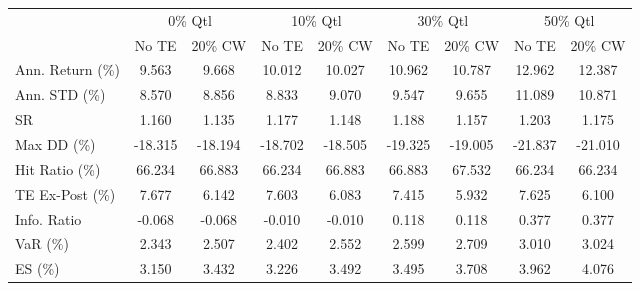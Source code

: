 \begin{tabular}{lcccccccc}
\toprule
{} & \multicolumn{2}{c}{0\% Qtl} & \multicolumn{2}{c}{10\% Qtl} & \multicolumn{2}{c}{30\% Qtl} & \multicolumn{2}{c}{50\% Qtl} \\
{} &   No TE &  20\% CW &   No TE &  20\% CW &   No TE &  20\% CW &   No TE &  20\% CW \\
\midrule
Ann. Return (\%) &   9.563 &   9.668 &  10.012 &  10.027 &  10.962 &  10.787 &  12.962 &  12.387 \\
Ann. STD (\%)    &   8.570 &   8.856 &   8.833 &   9.070 &   9.547 &   9.655 &  11.089 &  10.871 \\
SR              &   1.160 &   1.135 &   1.177 &   1.148 &   1.188 &   1.157 &   1.203 &   1.175 \\
Max DD (\%)      & -18.315 & -18.194 & -18.702 & -18.505 & -19.325 & -19.005 & -21.837 & -21.010 \\
Hit Ratio (\%)   &  66.234 &  66.883 &  66.234 &  66.883 &  66.883 &  67.532 &  66.234 &  66.234 \\
TE Ex-Post (\%)  &   7.677 &   6.142 &   7.603 &   6.083 &   7.415 &   5.932 &   7.625 &   6.100 \\
Info. Ratio     &  -0.068 &  -0.068 &  -0.010 &  -0.010 &   0.118 &   0.118 &   0.377 &   0.377 \\
VaR (\%)         &   2.343 &   2.507 &   2.402 &   2.552 &   2.599 &   2.709 &   3.010 &   3.024 \\
ES (\%)          &   3.150 &   3.432 &   3.226 &   3.492 &   3.495 &   3.708 &   3.962 &   4.076 \\
\bottomrule
\end{tabular}
